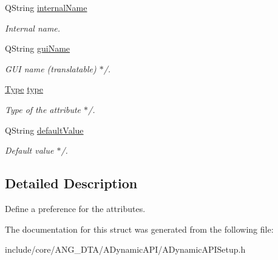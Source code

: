 \begin{DoxyCompactItemize}
\item 
Q\+String \hyperlink{structADynamicAPISetup_1_1UserPreference_a62299a647e304a4e63faac960aca8780}{internal\+Name}\hypertarget{structADynamicAPISetup_1_1UserPreference_a62299a647e304a4e63faac960aca8780}{}\label{structADynamicAPISetup_1_1UserPreference_a62299a647e304a4e63faac960aca8780}

\begin{DoxyCompactList}\small\item\em Internal name. \end{DoxyCompactList}\item 
Q\+String \hyperlink{structADynamicAPISetup_1_1UserPreference_a888b46736d2dc58e2dfdf5be6b25eaaf}{gui\+Name}\hypertarget{structADynamicAPISetup_1_1UserPreference_a888b46736d2dc58e2dfdf5be6b25eaaf}{}\label{structADynamicAPISetup_1_1UserPreference_a888b46736d2dc58e2dfdf5be6b25eaaf}

\begin{DoxyCompactList}\small\item\em G\+UI name (translatable) $\ast$/. \end{DoxyCompactList}\item 
\hyperlink{classADynamicAPISetup_a0ffce2ed1acaeaf1f058fab833e375c3}{Type} \hyperlink{structADynamicAPISetup_1_1UserPreference_a0a3921ad31e2d900ebabf882880a79de}{type}\hypertarget{structADynamicAPISetup_1_1UserPreference_a0a3921ad31e2d900ebabf882880a79de}{}\label{structADynamicAPISetup_1_1UserPreference_a0a3921ad31e2d900ebabf882880a79de}

\begin{DoxyCompactList}\small\item\em Type of the attribute $\ast$/. \end{DoxyCompactList}\item 
Q\+String \hyperlink{structADynamicAPISetup_1_1UserPreference_a392a22602cc6ed22712253fe7ed47e04}{default\+Value}\hypertarget{structADynamicAPISetup_1_1UserPreference_a392a22602cc6ed22712253fe7ed47e04}{}\label{structADynamicAPISetup_1_1UserPreference_a392a22602cc6ed22712253fe7ed47e04}

\begin{DoxyCompactList}\small\item\em Default value $\ast$/. \end{DoxyCompactList}\end{DoxyCompactItemize}


\subsection{Detailed Description}
Define a preference for the attributes. 

The documentation for this struct was generated from the following file\+:\begin{DoxyCompactItemize}
\item 
include/core/\+A\+N\+G\+\_\+\+D\+T\+A/\+A\+Dynamic\+A\+P\+I/A\+Dynamic\+A\+P\+I\+Setup.\+h\end{DoxyCompactItemize}
